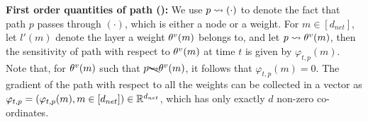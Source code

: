 \textbf{First order quantities of path ():} We use $p\rightsquigarrow (\cdot)$ to denote the fact that path $p$ passes through $(\cdot)$, which is either a node or a weight.  For $m\in[d_{net}]$, let $l'(m)$ denote the layer a weight $\theta^v(m)$ belongs to, and let $p\rightsquigarrow\theta^v(m)$, then the sensitivity of path with respect to $\theta^v(m)$ at time $t$ is given by $\varphi_{t,p}(m)$. Note that, for $\theta^v(m)$ such that $p\bcancel{\rightsquigarrow}\theta^v(m)$, it follows that $\varphi_{t,p}(m)=0$. The gradient of the path with respect to all the weights can be collected in a vector as $\varphi_{t,p}=(\varphi_{t,p}(m),m\in[d_{net}])\in\mathbb{R}^{d_{net}}$, which has only exactly $d$ non-zero co-ordinates.
\begin{comment}
\textbf{Deep Gated Network (\Cref{tb:dgn-path}):}  A parameterised DGN consists of two networks namely the \emph{gating} network (parameterised by $\Tg\in \R^{d_{net}}$),  which is responsible for producing the gating values, and a \emph{value} network (parameterised by $\Tv\in\R^{d_{net}}$ ), which is responsible for predicting the output. For layer $l\in[d-1]$, the pre-activation input, the output, the gating values are denoted by $q(l)\in\R^w, z(l)\in\R^w$ and $G(l)\in(0,1+\epsilon)^w$ respectively (dependence on the input $x\in \R^{d_{in}}$, and the underlying parameter is shown in the subscript). In \Cref{tb:dgn-path}, $\odot$ stands for the \emph{Hadamard} product. Note that a separate gating network is always not necessary: at time $t$, by specifying the gating values for all the $n$ input example in $\G_t\stackrel{def}=\{G_{x_{s},t}(l,i), \forall s\in[n],l\in[d-1],i\in[w]\}$ (where $G(l,i)$ is the gating of $i^{th}$ node in $l^{th}$ layer), we can recover the outputs $\hat{y}_t(x_s)\in \R$ for all the inputs $\{x_s\}_{s=1}^n$ in the dataset as $\hat{y}_t(x_s)=\sum_{p\in P}x_s(p(0))A_t(x_s,p)v_t(p)$. A DGN is denoted by $\N(G_t;\Tv_t)$ and a parameterised DGN is denoted by $\N(\Tg_t,\beta;\Tv_t)$ ($\epsilon>0$ is treated as a hyper-parameter and is hence left out of the notation). The following points are to be noted:

$1.$ The soft-max sigmoidal gating (or soft-ReLU) function $\chi_\epsilon$ takes values in $(0,1+\epsilon)$. The soft-ReLU is differentiable, and hence $A_t(x,p)$ is differentiable.

$2.$ The DNN with ReLU activations is a special case and can be denoted by $\N(\Tg_t,\beta;\Tv_t)$.

$3.$ The DNG framework enables us to study various gating regimes, an aspect which will be used extensively in in \Cref{sec:generaisation}.
\end{comment}

